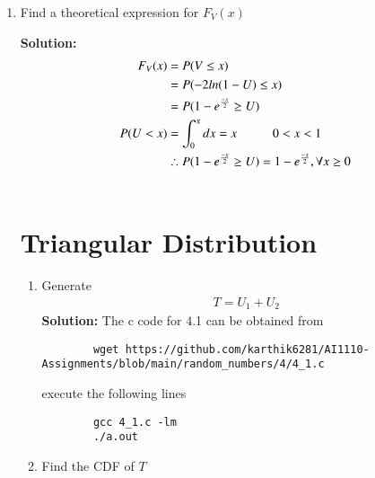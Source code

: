 \documentclass[journal,12pt,twocolumn]{IEEEtran}
\newcommand{\solution}{\noindent \textbf{Solution: }}
\numberwithin{equation}{section}
\renewcommand\thesection{\arabic{section}}
\begin{document}
\begin{enumerate}[label=\thesection.\arabic*,ref=\thesection.\theenumi]
	\item Find a theoretical expression for $F_V(x)$
	
	\solution \begin{align}
 F_{V}(x)&=P(V \leq x)\\
 &=P(-2 ln(1-U) \leq x)\\
 &=P(1-e^{\frac{-x}{2}} \geq U)\\
 P(U<x)&=\int_{0}^{x} dx=x \hspace{10mm} \text{$0 < x < 1$}\\
 &\therefore P(1-e^{\frac{-x}{2}} \geq U)=1-e^{\frac{-x}{2}}, \forall x\geq 0 \\ 
 \nonumber
 \end{align}
	
	\section{Triangular Distribution}
	\begin{enumerate}[label=\thesection.\arabic*,ref=\thesection.\theenumi]
	\item Generate 
	\begin{align}
		T = U_1+U_2
	\end{align}
	\solution The c code for 4.1 can be obtained from
	\begin{lstlisting}
		wget https://github.com/karthik6281/AI1110-Assignments/blob/main/random_numbers/4/4_1.c
	\end{lstlisting}
	execute the following lines
	\begin{lstlisting}
		gcc 4_1.c -lm
		./a.out
	\end{lstlisting}
	
	\item Find the CDF of $T$
	

\end{enumerate}
\end{enumerate}
\end{document}
